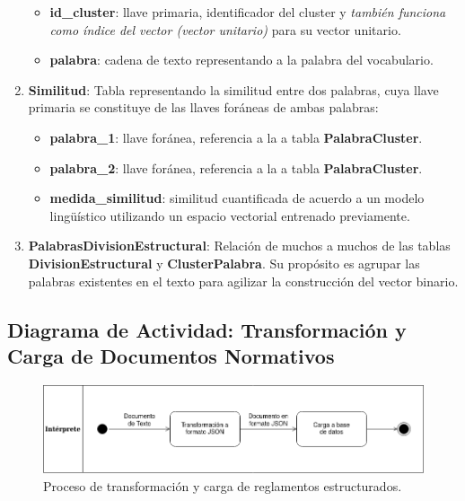 \begin{enumerate}
   
   \begin{itemize}
       \item \textbf{id\_cluster}: llave primaria, identificador del cluster y \textit{también funciona como índice del vector (vector unitario)} para su vector unitario.
       \item \textbf{palabra}: cadena de texto representando a la palabra del vocabulario.
   \end{itemize}
   
   \item \textbf{Similitud}: Tabla representando la similitud entre dos palabras, cuya llave primaria se constituye de las llaves foráneas de ambas palabras:
   
   \begin{itemize}
       \item \textbf{palabra\_1}: llave foránea, referencia a la a tabla \textbf{PalabraCluster}.
       \item \textbf{palabra\_2}: llave foránea, referencia a la a tabla \textbf{PalabraCluster}.
       \item \textbf{medida\_similitud}: similitud cuantificada de acuerdo a un modelo lingüístico utilizando un espacio vectorial entrenado previamente.
   \end{itemize}

    \item \textbf{PalabrasDivisionEstructural}: Relación de muchos a muchos de las tablas \textbf{DivisionEstructural} y \textbf{ClusterPalabra}. Su propósito es agrupar las palabras existentes en el texto para agilizar la construcción del vector binario.
\end{enumerate}

\subsection{Diagrama de Actividad: Transformación y Carga de Documentos Normativos}

\begin{figure}[ht]
    \centering
    \includegraphics[scale=0.54]{images/5/actividad-transformacion.png}
    \caption{Proceso de transformación y carga de reglamentos estructurados.}
    \label{fig:actividad-transformacion}
\end{figure}

